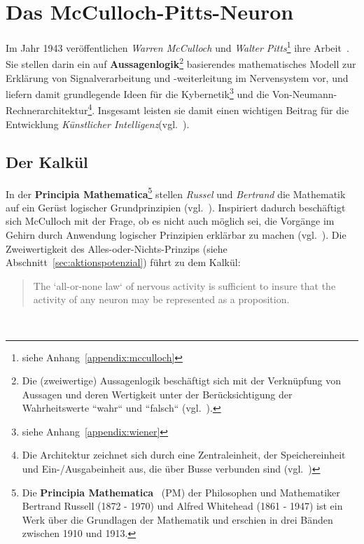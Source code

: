 \section{Das McCulloch-Pitts-Neuron}\label{sec:mcpneuron}

Im Jahr 1943 veröffentlichen \textit{Warren McCulloch} und \textit{Walter Pitts}\footnote{
    siehe Anhang~\ref{appendix:mcculloch}
} ihre Arbeit~\cite{MP43}.
Sie stellen darin ein auf \textbf{Aussagenlogik}\footnote{
    Die (zweiwertige) Aussagenlogik beschäftigt sich mit der Verknüpfung von Aussagen und deren Wertigkeit unter der Berücksichtigung der Wahrheitswerte ``wahr`` und ``falsch`` (vgl.~\cite[2]{Rau88}).
} basierendes mathematisches Modell zur Erklärung von Signalverarbeitung und  -weiterleitung im Nervensystem vor, und liefern damit grundlegende Ideen für die Kybernetik\footnote{
    siehe Anhang~\ref{appendix:wiener}
} und die Von-Neumann-Rechnerarchitektur\footnote{
    Die Architektur zeichnet sich durch eine Zentraleinheit, der Speichereinheit und Ein-/Ausgabeinheit aus, die über Busse verbunden sind (vgl.~\cite[230]{OV00})
}. Insgesamt leisten sie damit einen wichtigen Beitrag für die Entwicklung \textit{Künstlicher Intelligenz}(vgl.~\cite[1]{Arb19}).


\subsection{Der Kalkül}\label{sec:mcpkalkül}

In der \textbf{Principia Mathematica}\footnote{
    Die \textbf{Principia Mathematica}~\cite{PW27} (PM) der Philosophen und Mathematiker Bertrand Russell (1872 - 1970) und Alfred Whitehead (1861 - 1947) ist ein Werk über die Grundlagen der Mathematik und erschien in drei Bänden zwischen 1910 und 1913.
} stellen \textit{Russel} und \textit{Bertrand} die Mathematik auf ein Gerüst logischer Grundprinzipien (vgl.~\cite[225]{She26}). Inspiriert dadurch beschäftigt sich McCulloch mit der Frage, ob es nicht auch möglich sei, die Vorgänge im Gehirn durch Anwendung logischer Prinzipien erklärbar zu machen (vgl.~\cite[4]{Arb19}). Die Zweiwertigkeit des Alles-oder-Nichts-Prinzips (siehe Abschnitt~\ref{sec:aktionspotenzial}) führt zu dem Kalkül:\\

\blockquote[{\cite[100]{MP43}}]{
    The `all-or-none law` of nervous activity is sufficient to insure that the activity of any neuron may be represented as a proposition.
}\\

